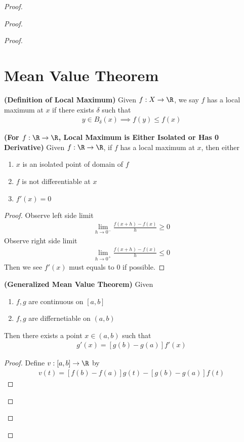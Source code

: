 \documentclass{report}
\begin{document}
\begin{proof}
\begin{proof}
\begin{proof}
\section{Mean Value Theorem}
\begin{definition}
\label{6.2.1}
\textbf{(Definition of Local Maximum)} Given $f:X\rightarrow \R$, we say $f$ has a local maximum at  $x$ if there exists  $\delta$ such that 
\begin{align*}
y \in B_{\delta}(x)\implies f(y)\leq f(x)
\end{align*}
\end{definition}
\begin{theorem}
\label{6.2.2}
\textbf{(For $f:\R\rightarrow \R$, Local Maximum is Either Isolated or Has 0 Derivative)} Given $f:\R\rightarrow \R$, if $f$ has a local maximum at  $x$, then either
\begin{enumerate}[label=(\alph*)]
  \item $x$ is an isolated point of domain of  $f$
   \item  $f$ is not differentiable at  $x$ 
  \item $f'(x)=0$ 
\end{enumerate}
\end{theorem}
\begin{proof}
Observe left side limit 
\begin{align*}
\lim_{h \to 0^-}\frac{f(x+h)-f(x)}{h}\geq 0
\end{align*}
Observe right side limit 
\begin{align*}
\lim_{h \to 0^+}\frac{f(x+h)-f(x)}{h}\leq 0
\end{align*}
Then we see $f'(x)$ must equals to $0$ if possible.
\end{proof}
\begin{theorem}
\label{6.2.3}
\textbf{(Generalized Mean Value Theorem)}
Given 
\begin{enumerate}[label=(\alph*)]
  \item $f,g$ are continuous on  $[a,b]$ 
  \item  $f,g$ are differnetiable on  $(a,b)$
\end{enumerate}
Then there exists a point $x\in (a,b)$ such that 
\begin{align*}
[f(b)-f(a)]g'(x)=[g(b)-g(a)]f'(x)
\end{align*}
\end{theorem}
\begin{proof}
Define $v:[a,b]\to \R$ by 
\begin{align*}
v(t)=[f(b)-f(a)]g(t)-[g(b)-g(a)]f(t)

\end{align*}
\end{proof}
\end{proof}
\end{proof}
\end{proof}
\end{document}
